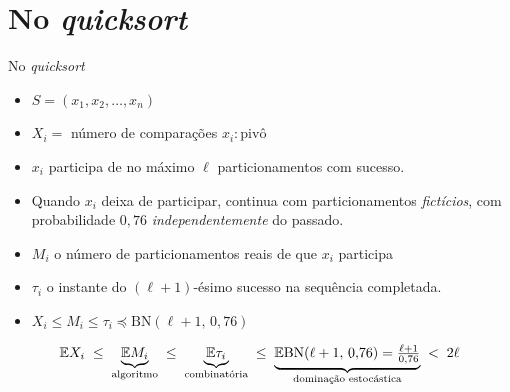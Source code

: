 \documentclass[aspectratio=169]{beamer}
\begin{document}
\section{No \textit{quicksort}}

\begin{frame}{No \textit{quicksort}}

  \begin{itemize}[<+->]\itemsep=.25cm
  \item $S=(x_1,x_2,\dots,x_n)$

  \item $X_{i}= $ número de comparações $x_i:\text{pivô}$

  \item $x_i$ participa de no máximo $\ell$ particionamentos com
    sucesso.

  \item Quando $x_i$ deixa de participar, continua com particionamentos
    \textit{fictícios}, com probabilidade $0{,}76$
    \textit{independentemente} do passado.

  \item $M_i$ o número de particionamentos reais de que $x_i$ participa

   \item $\tau_i$ o instante do $(\ell+1)$-ésimo sucesso na sequência
     completada.

  \item $X_{i}\leq M_i \leq \tau_i \preceq \mathrm{BN}(\ell+1,\,0{,}76)$
  \end{itemize}

  \pause
  
  $$
  \mathbb{E}{X_i}
  \;\le\;
  \underbrace{\mathbb{E}{M_i}}_{\text{algoritmo}}
  \;\le\;
  \underbrace{\mathbb{E}{\tau_i}}_{\text{combinatória}} 
  \;\le\;
  \underbrace{\mathbb{E}{\mathrm{BN}(\ell+1,\,0{,}76)}=\tfrac{\ell+1}{0{,}76}}_{\text{dominação estocástica}}
  \;<\;2\ell
  $$

  
\end{frame}
\end{document}
